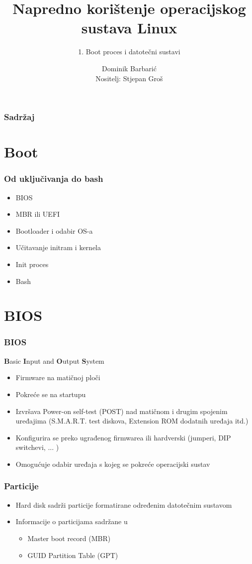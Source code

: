 \documentclass[t]{beamer}
\date{\todayiso}
\title[NKOSL]{Napredno korištenje operacijskog sustava Linux}
\author[Dominik Barbarić]{Dominik Barbarić\\{\small Nositelj: Stjepan Groš}}
\subtitle{1. Boot proces i datotečni sustavi}
\institute[FER]{Sveučilište u Zagrebu\\Fakultet elektrotehnike i računarstva}
\begin{document}
{
	\begin{frame}
		\maketitle
	\end{frame}
}

\begin{frame}
	\frametitle{Sadržaj}
	\tableofcontents
\end{frame}

\section{Boot}
\begin{frame}
    \frametitle{Od uključivanja do bash}
    \begin{itemize}
        \item BIOS 
        \item MBR ili UEFI
        \item Bootloader i odabir OS-a
        \item Učitavanje initram i kernela
        \item Init proces 
        \item Bash
    \end{itemize}
\end{frame}


\section{BIOS}
\begin{frame}
	\frametitle{BIOS}
	\textbf{B}asic \textbf{I}nput and \textbf{O}utput \textbf{S}ystem
	\begin{itemize}
		\item Firmware na matičnoj ploči
		\item Pokreće se na startupu
		\item Izvršava Power-on self-test (POST) nad matičnom i drugim spojenim uređajima (S.M.A.R.T. test diskova, Extension ROM dodatnih uređaja itd.)
		\item Konfigurira se preko ugrađenog firmwarea ili hardverski (jumperi, DIP switchevi, ... )
		\item Omogućuje odabir uređaja s kojeg se pokreće operacijski sustav
	\end{itemize}
\end{frame}

\begin{frame}
	\frametitle{Particije}
	\begin{itemize}
		\item Hard disk sadrži particije formatirane određenim datotečnim sustavom
		\item Informacije o particijama sadržane u
		\begin{itemize}
			\item Master boot record (MBR)
			\item GUID Partition Table (GPT)
		\end{itemize}
	\end{itemize}
\end{frame}	
\end{document}
